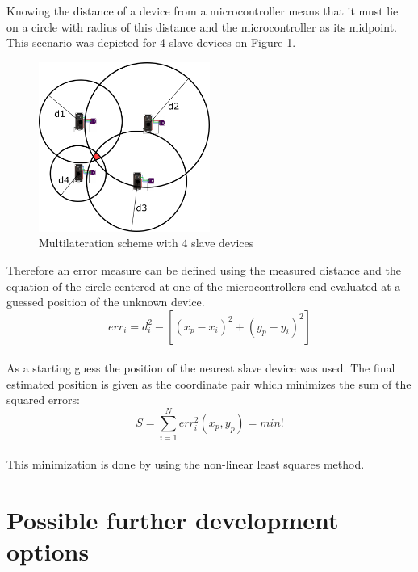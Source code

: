 \documentclass[11pt,a4paper]{article}
\numberwithin{equation}{section}   %
\numberwithin{figure}{section}     %
\numberwithin{table}{section}      %
\begin{document}
\newpage

Knowing the distance of a device from a microcontroller means that it must lie on a circle with radius of this distance and the microcontroller as its midpoint. This scenario was depicted for 4 slave devices on Figure \ref{fig:multilateration}.

\begin{figure}[H]
    \centering
    \includegraphics[width = 0.5\textwidth]{figures/multilateration.png}
    \caption{Multilateration scheme with 4 slave devices}
    \label{fig:multilateration}
\end{figure}

Therefore an error measure can be defined using the measured distance and the equation of the circle centered at one of the microcontrollers end evaluated at a guessed position of the unknown device.\\

\begin{equation*}
    err_i = d_i^2 - \left[(x_p - x_i)^2 + (y_p - y_i)^2 \right]
\end{equation*}\\

As a starting guess the position of the nearest slave device was used. The final estimated position is given as the coordinate pair which minimizes the sum of the squared errors:\\

\begin{equation*}
    S = \sum_{i=1}^{N} err_i^2(x_p, y_p) = min!
\end{equation*}\\

This minimization is done by using the non-linear least squares method.

\newpage

\section{Possible further development options}
\end{document}
